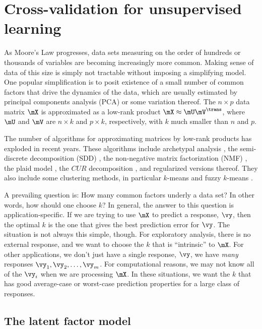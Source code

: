 
\chapter{Cross-validation for unsupervised learning}

As Moore's Law progresses, data sets measuring on the order of hundreds or
thousands of variables are becoming increasingly more common. Making sense of
data of this size is simply not tractable without imposing a simplifying
model. One popular simplification is to posit existence of a small number of
common factors that drive the dynamics of the data, which are usually
estimated by principal components analysis (PCA) or some variation thereof.
The $n \times p$ data matrix $\mX$ is approximated as a low-rank product $\mX
\approx \mU \mV^\trans$, where $\mU$ and $\mV$ are $n \times k$ and $p \times
k$, respectively, with $k$ much smaller than $n$ and $p$.

The number of algorithms for approximating matrices by low-rank products has
exploded in recent years. These algorithms include archetypal analysis
\cite{cutler1994aa}, the semi-discrete decomposition (SDD)
\cite{kolda1998smd}, the non-negative matrix factorization (NMF)
\cite{lee1999lpo}, the plaid model \cite{lazzeroni2002pmg}, the $CUR$
decomposition \cite{drineas2007fmc}, and regularized versions thereof. They
also include some clustering methods, in particular $k$-means and fuzzy
$k$-means \cite{bezdek1980fmp}.

A prevailing question is: How many common factors underly a data set? In other
words, how should one choose $k$? In general, the answer to this question is
application-specific. If we are trying to use $\mX$ to predict a response,
$\vy$, then the optimal $k$ is the one that gives the best prediction error
for $\vy$. The situation is not always this simple, though. For exploratory
analysis, there is no external response, and we want to choose the $k$ that is
``intrinsic'' to $\mX$. For other applications, we don't just have a single
response, $\vy$, we have \emph{many} responses $\vy_1, \vy_2, \ldots, \vy_m$.
For computational reasons, we may not know all of the $\vy_i$ when we are
processing $\mX$. In these situations, we want the $k$ that has good
average-case or worst-case prediction properties for a large class of
responses.


\section{The latent factor model}

